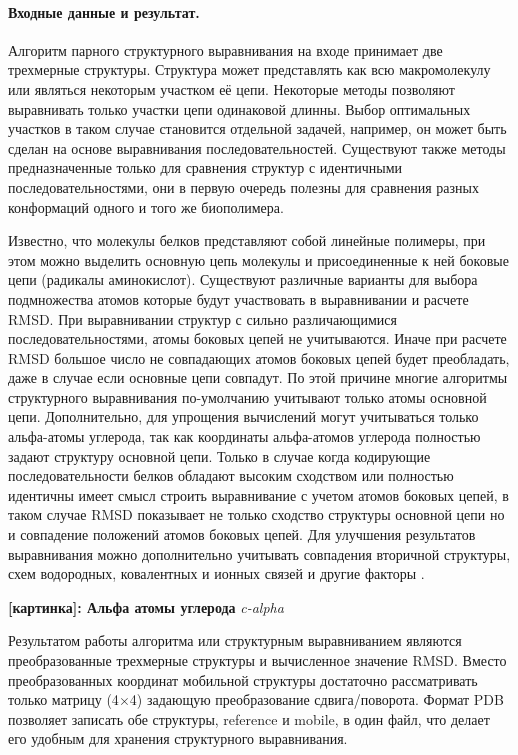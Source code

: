 \documentclass[a4paper, 12pt, titlepage, utf8]{extarticle}
\newcommand{\myimage}[2]{   
    \begin{center} \textbf{[картинка]: #1} \textit{#2} \end{center} 
}
\begin{document}
\paragraph{Входные данные и результат.}
Алгоритм парного структурного выравнивания на входе принимает две трехмерные структуры. Структура может представлять как всю макромолекулу или являться некоторым участком её цепи. Некоторые методы позволяют выравнивать только участки цепи одинаковой длинны. Выбор оптимальных участков в таком случае становится отдельной задачей, например, он может быть сделан на основе выравнивания последовательностей. Существуют также методы предназначенные только для сравнения структур с идентичными последовательностями, они в первую очередь полезны для сравнения разных конформаций одного и того же биополимера. 

Известно, что молекулы белков представляют собой линейные полимеры, при этом можно выделить основную цепь молекулы и присоединенные к ней боковые цепи (радикалы аминокислот). Существуют различные варианты для выбора подмножества атомов которые будут участвовать в выравнивании и расчете RMSD. При выравнивании структур с сильно различающимися последовательностями, атомы боковых цепей не учитываются. Иначе при расчете RMSD большое число не совпадающих атомов боковых цепей будет преобладать, даже в случае если основные цепи совпадут. По этой причине многие алгоритмы структурного выравнивания по-умолчанию учитывают только атомы основной цепи. Дополнительно, для упрощения вычислений могут учитываться только альфа-атомы углерода, так как координаты альфа-атомов углерода полностью задают структуру основной цепи. Только в случае когда кодирующие последовательности белков обладают высоким сходством или полностью идентичны имеет смысл строить выравнивание с учетом атомов боковых цепей, в таком случае RMSD показывает не только сходство структуры основной цепи но и совпадение положений атомов боковых цепей. Для улучшения результатов выравнивания можно дополнительно учитывать совпадения вторичной структуры, схем водородных, ковалентных и ионных связей и другие факторы \cite{wiki-3}. 

\myimage{Альфа атомы углерода}{c-alpha}

Результатом работы алгоритма или структурным выравниванием являются преобразованные трехмерные структуры и вычисленное значение RMSD. Вместо преобразованных координат мобильной структуры достаточно рассматривать только матрицу (4$\times$4) задающую преобразование сдвига/поворота. Формат PDB позволяет записать обе структуры, reference и mobile, в один файл, что делает его удобным для хранения структурного выравнивания.
\end{document}
